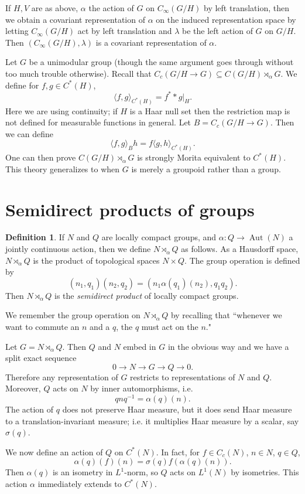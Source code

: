 \documentclass[12pt]{report}
\newcommand{\Aut}{\operatorname{Aut}}
\newcommand{\dfn}[1]{\emph{#1}\index{#1}}
\theoremstyle{definition}
\newtheorem{definition}[theorem]{Definition}
\begin{document}
    If $H,V$ are as above, $\alpha$ the action of $G$ on $C_\infty(G/H)$ by left translation, then we obtain a covariant representation of $\alpha$ on the induced representation space by letting $C_\infty(G/H)$ act by left translation and $\lambda$ be the left action of $G$ on $G/H$. Then $(C_\infty(G/H), \lambda)$ is a covariant representation of $\alpha$.

    Let $G$ be a unimodular group (though the same argument goes through without too much trouble otherwise). Recall that $C_c(G/H \to G) \subseteq C(G/H) \rtimes_\alpha G$. We define for $f, g \in C^*(H)$,
    $$\langle f, g\rangle_{C^*(H)} = f^* * g|_H.$$
    Here we are using continuity; if $H$ is a Haar null set then the restriction map is not defined for measurable functions in general. Let $B = C_c(G/H \to G)$. Then we can define
    $$\langle f,g\rangle_B h = f \langle g, h\rangle_{C^*(H)}.$$
    One can then prove $C(G/H) \rtimes_\alpha G$ is strongly Morita equivalent to $C^*(H)$. This theory generalizes to when $G$ is merely a groupoid rather than a group.
\section{Semidirect products of groups}
\begin{definition}
    If $N$ and $Q$ are locally compact groups, and $\alpha: Q \to \Aut(N)$ a jointly continuous action, then we define $N \rtimes_\alpha Q$ as follows. As a Hausdorff space, $N \rtimes_\alpha Q$ is the product of topological spaces $N \times Q$. The group operation is defined by
    $$(n_1, q_1)(n_2, q_2) = (n_1\alpha(q_1)(n_2), q_1q_2).$$
    Then $N \rtimes_\alpha Q$ is the \dfn{semidirect product} of locally compact groups.
\end{definition}
    We remember the group operation on $N \rtimes_\alpha Q$ by recalling that ``whenever we want to commute an $n$ and a $q$, the $q$ must act on the $n$."

    Let $G = N \rtimes_\alpha Q$. Then $Q$ and $N$ embed in $G$ in the obvious way and we have a split exact sequence
    $$0 \to N \to G \to Q \to 0.$$
    Therefore any representation of $G$ restricts to representations of $N$ and $Q$. Moreover, $Q$ acts on $N$ by inner automorphisms, i.e.
    $$qnq^{-1} = \alpha(q)(n).$$
    The action of $q$ does not preserve Haar measure, but it does send Haar measure to a translation-invariant measure; i.e. it multiplies Haar measure by a scalar, say $\sigma(q)$.

    We now define an action of $Q$ on $C^*(N)$. In fact, for $f \in C_c(N)$, $n \in N$, $q \in Q$,
    $$\alpha(q)(f)(n) = \sigma(q)f(\alpha(q)(n)).$$
    Then $\alpha(q)$ is an isometry in $L^1$-norm, so $Q$ acts on $L^1(N)$ by isometries. This action $\alpha$ immediately extends to $C^*(N)$.
\end{document}

